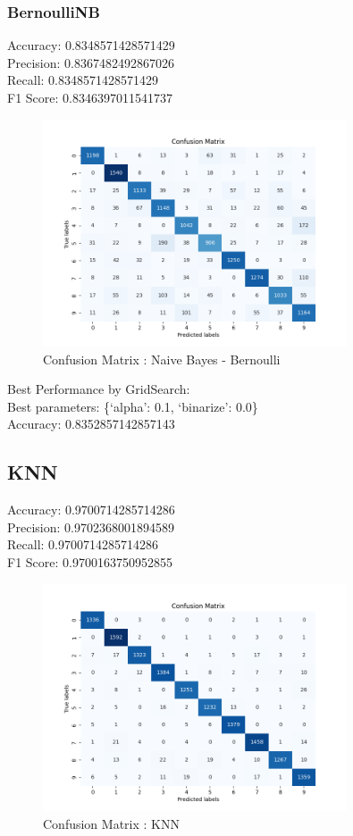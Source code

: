 \documentclass{assignmeownt}
\begin{document}
\subsubsection*{BernoulliNB}
Accuracy: 0.8348571428571429 \\
Precision: 0.8367482492867026 \\
Recall: 0.8348571428571429 \\
F1 Score: 0.8346397011541737 \\
\begin{figure}[H]
    \centering
    \includegraphics[width=0.8\textwidth]{images/nbbConMat.png}
    \caption{Confusion Matrix : Naive Bayes - Bernoulli}
    \label{fig:3}
\end{figure}

Best Performance by GridSearch:\\
Best parameters: \{`alpha': 0.1, `binarize': 0.0\} \\
Accuracy: 0.8352857142857143 \\
\clearpage
\subsection{KNN}
Accuracy: 0.9700714285714286 \\
Precision: 0.9702368001894589 \\
Recall: 0.9700714285714286 \\
F1 Score: 0.9700163750952855 \\
\begin{figure}[H]
    \centering
    \includegraphics[width=0.8\textwidth]{images/knnConMat.png}
    \caption{Confusion Matrix : KNN}
    \label{fig:4}
\end{figure}
\end{document}
